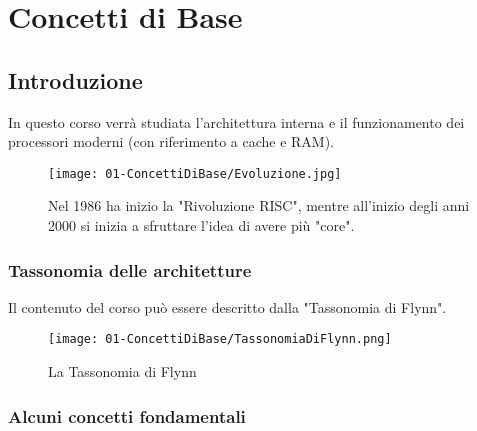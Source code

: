 \chapter{Concetti di Base}

\section{Introduzione}

In questo corso verrà studiata l'architettura interna e il funzionamento dei processori moderni (con riferimento a cache e RAM).


\begin{figure}[h]
    \centering
    \texttt{[image: 01-ConcettiDiBase/Evoluzione.jpg]}
    \caption{Nel 1986 ha inizio la "Rivoluzione RISC", mentre all'inizio degli anni 2000 si inizia a sfruttare l'idea di avere più "core".}
\end{figure}

\subsection{Tassonomia delle architetture}

Il contenuto del corso può essere descritto dalla "Tassonomia di Flynn". 


\begin{figure}[h]
    \centering
    \texttt{[image: 01-ConcettiDiBase/TassonomiaDiFlynn.png]}
    \caption{La Tassonomia di Flynn}
\end{figure}

\subsection{Alcuni concetti fondamentali}




